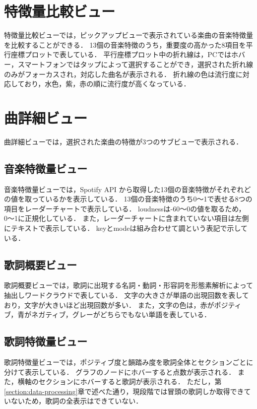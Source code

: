 \documentclass[titlepage]{jsreport}
\begin{document}
\section{特徴量比較ビュー}
特徴量比較ビューでは，ピックアップビューで表示されている楽曲の音楽特徴量を比較することができる．
13個の音楽特徴のうち，重要度の高かった8項目を平行座標プロットで表している．
平行座標プロット中の折れ線は，PCではホバー，スマートフォンではタップによって選択することができ，選択された折れ線のみがフォーカスされ，対応した曲名が表示される．
折れ線の色は流行度に対応しており，水色，紫，赤の順に流行度が高くなっている．

\section{曲詳細ビュー}

曲詳細ビューでは，選択された楽曲の特徴が3つのサブビューで表示される．

\subsection{音楽特徴量ビュー}
音楽特徴量ビューでは，Spotify API から取得した13個の音楽特徴がそれぞれどの値を取っているかを表示している．
13個の音楽特徴のうち0〜1で表せる8つの項目をレーダーチャートで表示している．
loudnessは-60〜0の値を取るため，0〜1に正規化している．
また，レーダーチャートに含まれていない項目は左側にテキストで表示している．
keyとmodeは組み合わせて調という表記で示している．

\subsection{歌詞概要ビュー}
歌詞概要ビューでは，歌詞に出現する名詞・動詞・形容詞を形態素解析によって抽出しワードクラウドで表している．
文字の大きさが単語の出現回数を表しており，文字が大きいほど出現回数が多い．
また，文字の色は，赤がポジティブ，青がネガティブ，グレーがどちらでもない単語を表している．

\subsection{歌詞特徴量ビュー}
歌詞特徴量ビューでは，ポジティブ度と韻踏み度を歌詞全体とセクションごとに分けて表示している．
グラフのノードにホバーすると点数が表示される．
また，横軸のセクションにホバーすると歌詞が表示される．
ただし，第\ref{section:data-processing}章で述べた通り，現段階では冒頭の歌詞しか取得できていないため，歌詞の全表示はできていない．
\end{document}
